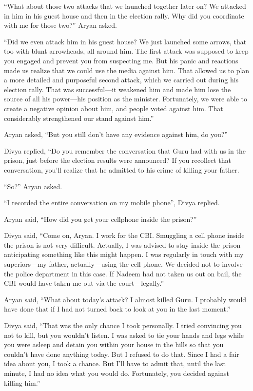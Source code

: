“What about those two attacks that we launched together later on? We attacked in
him in his guest house and then in the election rally. Why did you coordinate
with me for those two?” Aryan asked.

“Did we even attack him in his guest house? We just launched some arrows, that
too with blunt arrowheads, all around him. The first attack was supposed to keep
you engaged and prevent you from suspecting me. But his panic and reactions made
us realize that we could use the media against him. That allowed us to plan a
more detailed and purposeful second attack, which we carried out during his
election rally. That was successful—it weakened him and made him lose the
source of all his power—his position as the minister. Fortunately, we were
able to create a negative opinion about him, and people voted against him. That
considerably strengthened our stand against him.”

Aryan asked, “But you still don't have any evidence against him, do you?”

Divya replied, “Do you remember the conversation that Guru had with us in the
prison, just before the election results were announced? If you recollect that
conversation, you'll realize that he admitted to his crime of killing your
father.

“So?” Aryan asked.

“I recorded the entire conversation on my mobile phone”, Divya replied.

Aryan said, “How did you get your cellphone inside the prison?”

Divya said, “Come on, Aryan. I work for the CBI. Smuggling a cell phone inside the
prison is not very difficult. Actually, I was advised to stay inside the prison
anticipating something like this might happen. I was regularly in touch with my
superiors—my father, actually—using the cell phone. We decided not to involve
the police department in this case. If Nadeem had not taken us out on bail, the
CBI would have taken me out via the court—legally.”

Aryan said, “What about today's attack? I almost killed Guru. I probably would
have done that if I had not turned back to look at you in the last moment.”

Divya said, “That was the only chance I took personally. I tried convincing you
not to kill, but you wouldn't listen. I was asked to tie your hands and legs
while you were asleep and detain you within your house in the hills so that you
couldn't have done anything today. But I refused to do that. Since I had a fair
idea about you, I took a chance. But I'll have to admit that, until the last
minute, I had no idea what you would do. Fortunately, you decided against
killing him.”

